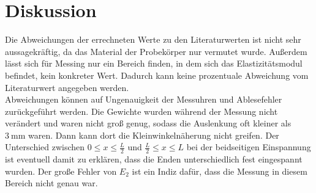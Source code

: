 \section{Diskussion}
\label{sec:Diskussion}
Die Abweichungen der errechneten Werte zu den Literaturwerten ist nicht sehr aussagekräftig, da das Material der Probekörper nur vermutet wurde.
Außerdem lässt sich für Messing nur ein Bereich finden, in dem sich das Elastizitätsmodul befindet, kein konkreter Wert.
Dadurch kann keine prozentuale Abweichung vom Literaturwert angegeben werden.\\

Abweichungen können auf Ungenauigkeit der Messuhren und Ablesefehler zurückgeführt werden.
Die Gewichte wurden während der Messung nicht verändert und waren nicht groß genug, sodass die Auslenkung oft kleiner als $\SI{3}{\milli\metre}$ waren.
Dann kann dort die Kleinwinkelnäherung nicht greifen.
Der Unterschied zwischen $0 \leq x \leq \frac{L}{2}$ und $\frac{L}{2}\leq x\leq L$ bei der beidseitigen Einspannung ist eventuell damit zu erklären, 
dass die Enden unterschiedlich fest eingespannt wurden. 
Der große Fehler von $E_2$ ist ein Indiz dafür, dass die Messung in diesem Bereich nicht genau war.

